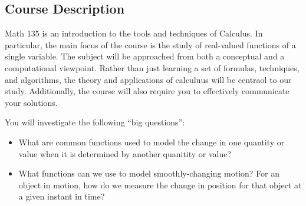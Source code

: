 \documentclass[11pt]{amsart}
\begin{document}
\subsection*{Course Description}
Math 135 is an introduction to the tools and techniques of Calculus.
In particular, the main focus of the course is the study of real-valued functions of a single variable.
The subject will be approached from both a conceptual and a computational viewpoint.
Rather than just learning a set of formulas, techniques, and algorithms,
the theory and applications of calculuus will be centraol to our study.
Additionally, the course will also require you to effectively communicate your solutions.

You will investigate the following ``big questions'':
\begin{itemize}
\item What are common functions used to model the change in one quantity or value when it is determined by another quanitity or value?
\item What functions can we use to model smoothly-changing motion? For an object in motion, how do we measure the change in position for that object at a given instant in time?

\end{itemize}
\end{document}
